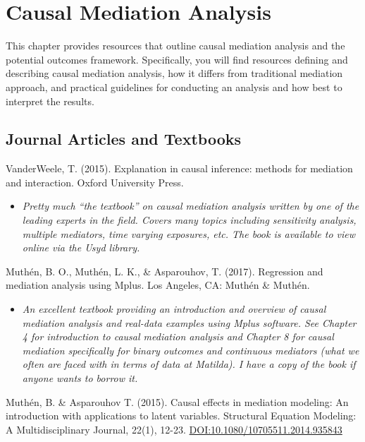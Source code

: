 \documentclass[
]{book}
\providecommand{\tightlist}{%
  \setlength{\itemsep}{0pt}\setlength{\parskip}{0pt}}
\begin{document}
\chapter{Causal Mediation Analysis}\label{causal-mediation-analysis}

This chapter provides resources that outline causal mediation analysis and the potential outcomes framework. Specifically, you will find resources defining and describing causal mediation analysis, how it differs from traditional mediation approach, and practical guidelines for conducting an analysis and how best to interpret the results.

\section{Journal Articles and Textbooks}\label{journal-articles-and-textbooks-3}

VanderWeele, T. (2015). Explanation in causal inference: methods for mediation and interaction. Oxford University Press.

\begin{itemize}
\tightlist
\item
  \emph{Pretty much ``the textbook'' on causal mediation analysis written by one of the leading experts in the field. Covers many topics including sensitivity analysis, multiple mediators, time varying exposures, etc. The book is available to view online via the Usyd library. }
\end{itemize}

Muthén, B. O., Muthén, L. K., \& Asparouhov, T. (2017). Regression and mediation analysis using Mplus. Los Angeles, CA: Muthén \& Muthén.

\begin{itemize}
\tightlist
\item
  \emph{An excellent textbook providing an introduction and overview of causal mediation analysis and real-data examples using Mplus software. See Chapter 4 for introduction to causal mediation analysis and Chapter 8 for causal mediation specifically for binary outcomes and continuous mediators (what we often are faced with in terms of data at Matilda). I have a copy of the book if anyone wants to borrow it.}
\end{itemize}

Muthén, B. \& Asparouhov T. (2015). Causal effects in mediation modeling: An introduction with applications to latent variables. Structural Equation Modeling: A Multidisciplinary Journal, 22(1), 12-23. \url{DOI:10.1080/10705511.2014.935843}
\end{document}
